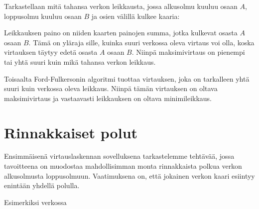 Tarkastellaan mitä tahansa verkon leikkausta,
jossa alkusolmu kuuluu osaan $A$,
loppusolmu kuuluu osaan $B$ ja osien välillä kulkee kaaria:

\begin{center}
\end{center}

Leikkauksen paino on niiden kaarten painojen summa,
jotka kulkevat osasta $A$ osaan $B$.
Tämä on yläraja sille, kuinka suuri verkossa oleva virtaus voi olla,
koska virtauksen täytyy edetä osasta $A$ osaan $B$.
Niinpä maksimivirtaus on pienempi tai yhtä suuri kuin
mikä tahansa verkon leikkaus.

Toisaalta Ford-Fulkersonin algoritmi tuottaa virtauksen,
joka on tarkalleen yhtä suuri kuin verkossa oleva leikkaus.
Niinpä tämän virtauksen on oltava maksimivirtaus ja
vastaavasti leikkauksen on oltava minimileikkaus.

\section{Rinnakkaiset polut}

Ensimmäisenä virtauslaskennan sovelluksena tarkastelemme
tehtävää, jossa tavoitteena on muodostaa mahdollisimman
monta rinnakkaista polkua verkon alkusolmusta loppusolmuun.
Vaatimuksena on, että jokainen verkon kaari esiintyy
enintään yhdellä polulla.

Esimerkiksi verkossa
\begin{center}
\end{center}

